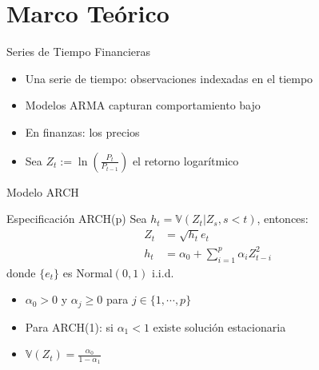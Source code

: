 \section{Marco Teórico}

\begin{frame}{Series de Tiempo Financieras}
    \begin{itemize}
        \item<1-> Una serie de tiempo: observaciones indexadas en el tiempo
        \item<2-> Modelos ARMA capturan comportamiento bajo 
        \item<3-> En finanzas: los precios 
        \item<4-> Sea $Z_t := \ln\left(\frac{P_t}{P_{t-1}}\right)$ el retorno logarítmico
    \end{itemize}
    
    \vspace{1em}
    
\end{frame}

\begin{frame}{Modelo ARCH}
    \begin{block}{Especificación ARCH(p)}
        Sea $h_t= \mathbb{V}\left(Z_t|Z_s,s<t\right)$, entonces:
        \begin{align}
            Z_t &= \sqrt{h_t} e_{t} \\
            h_t &= \alpha_0 + \sum_{i=1}^{p} \alpha_i Z_{t-i}^2
        \end{align}
        donde $\{e_t\}$ es Normal$(0,1)$ i.i.d.
    \end{block}
    
    \vspace{0.5em}
    
    \begin{itemize}
        \item<2-> $\alpha_0>0$ y $\alpha_j\geq 0$ para $j\in \{1,\cdots,p\}$
        \item<3-> Para ARCH(1): si $\alpha_1<1$ existe solución estacionaria
        \item<4-> $\mathbb{V}(Z_t) = \frac{\alpha_0}{1-\alpha_1}$
    \end{itemize}
\end{frame}

